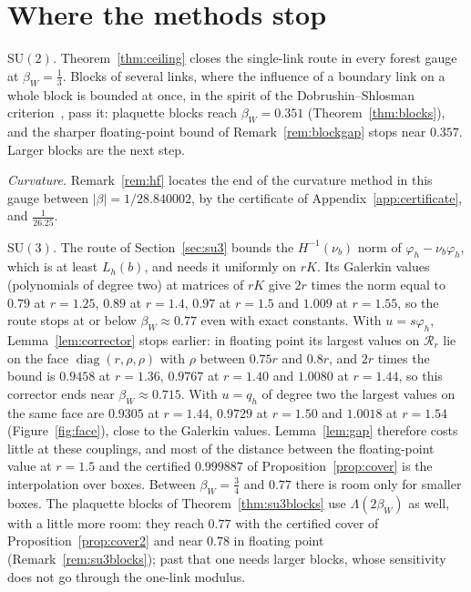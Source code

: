 \documentclass[11pt]{amsart}
\theoremstyle{definition}
\theoremstyle{remark}
\numberwithin{equation}{section}
\newcommand{\SU}{\mathrm{SU}}
\begin{document}
\section{Where the methods stop}\label{sec:limits}

\emph{$\SU(2)$.} Theorem~\ref{thm:ceiling} closes the single-link route in
every forest gauge at $\beta_W=\frac13$. Blocks of several links, where the
influence of a boundary link on a whole block is bounded at once, in the
spirit of the Dobrushin--Shlosman criterion~\cite{DS85}, pass it:
plaquette blocks reach $\beta_W=0.351$ (Theorem~\ref{thm:blocks}), and the
sharper floating-point bound of Remark~\ref{rem:blockgap} stops near
$0.357$. Larger blocks are the next step.

\emph{Curvature.} Remark~\ref{rem:hf} locates the end of the curvature
method in this gauge between $|\beta|=1/28.840002$, by the
certificate of Appendix~\ref{app:certificate}, and $\frac1{26.25}$.

\emph{$\SU(3)$.} The route of Section~\ref{sec:su3} bounds the
$H^{-1}(\nu_b)$ norm of $\varphi_h-\nu_b\varphi_h$, which is at least
$L_h(b)$, and needs it uniformly on $rK$. Its Galerkin values (polynomials
of degree two) at matrices of $rK$ give $2r$ times the norm equal to $0.79$
at $r=1.25$, $0.89$ at $r=1.4$, $0.97$ at $r=1.5$ and $1.009$ at $r=1.55$, so
the route stops at or below $\beta_W\approx0.77$ even with exact constants.
With $u=s\varphi_h$, Lemma~\ref{lem:corrector} stops earlier: in floating
point its largest values on $\mathcal R_r$ lie on the face
$\operatorname{diag}(r,\rho,\rho)$ with $\rho$ between $0.75r$ and $0.8r$, and
$2r$ times the bound is $0.9458$ at $r=1.36$, $0.9767$ at $r=1.40$ and $1.0080$
at $r=1.44$, so this corrector ends near $\beta_W\approx0.715$. With $u=q_h$
of degree two the largest values on the same face are $0.9305$ at $r=1.44$,
$0.9729$ at $r=1.50$ and $1.0018$ at $r=1.54$ (Figure~\ref{fig:face}), close to the
Galerkin values. Lemma~\ref{lem:gap} therefore costs
little at these couplings, and most of the distance between the
floating-point value at $r=1.5$ and the certified $0.999887$ of
Proposition~\ref{prop:cover} is the interpolation over boxes. Between
$\beta_W=\frac34$ and $0.77$ there is room only for smaller boxes. The
plaquette blocks of Theorem~\ref{thm:su3blocks} use $\Lambda(2\beta_W)$ as
well, with a little more room: they reach $0.77$ with the certified cover of
Proposition~\ref{prop:cover2} and near $0.78$ in floating point
(Remark~\ref{rem:su3blocks}); past that one needs larger blocks, whose
sensitivity does not go through the one-link modulus.
\end{document}
